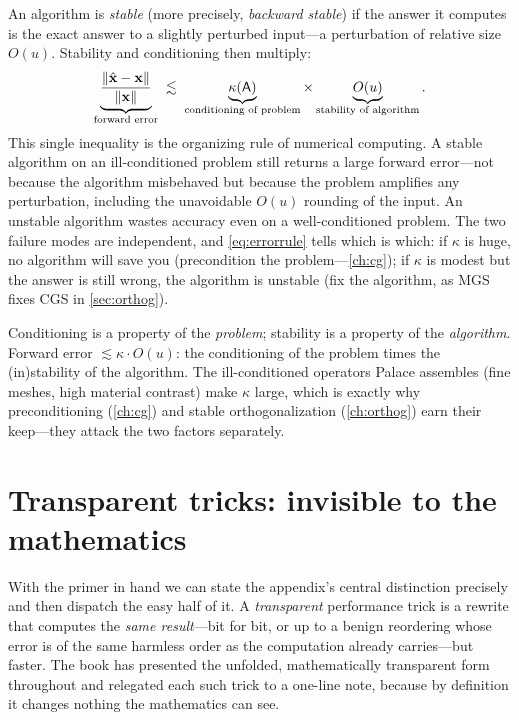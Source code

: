 An algorithm is \emph{stable} (more precisely, \emph{backward stable}) if the
answer it computes is the exact answer to a slightly perturbed input---a
perturbation of relative size $O(u)$. Stability and conditioning then multiply:
\begin{equation}
\label{eq:errorrule}
  \underbrace{\frac{\lVert\hat{\mathbf{x}} - \mathbf{x}\rVert}{\lVert\mathbf{x}\rVert}}_{\text{forward error}}
  \;\lesssim\;
  \underbrace{\kappa(\mathsf{A})}_{\text{conditioning of problem}}
  \times
  \underbrace{O(u)}_{\text{stability of algorithm}} .
\end{equation}
This single inequality is the organizing rule of numerical computing. A stable
algorithm on an ill-conditioned problem still returns a large forward error---not
because the algorithm misbehaved but because the problem amplifies any
perturbation, including the unavoidable $O(u)$ rounding of the input. An unstable
algorithm wastes accuracy even on a well-conditioned problem. The two failure modes
are independent, and \eqref{eq:errorrule} tells which is which: if $\kappa$ is huge,
no algorithm will save you (precondition the problem---\cref{ch:cg}); if $\kappa$ is
modest but the answer is still wrong, the algorithm is unstable (fix the algorithm,
as MGS fixes CGS in \cref{sec:orthog}).

\begin{keyidea}
Conditioning is a property of the \emph{problem}; stability is a property of the
\emph{algorithm}. Forward error $\lesssim \kappa \cdot O(u)$: the conditioning of
the problem times the (in)stability of the algorithm. The ill-conditioned operators
Palace assembles (fine meshes, high material contrast) make $\kappa$ large, which
is exactly why preconditioning (\cref{ch:cg}) and stable orthogonalization
(\cref{ch:orthog}) earn their keep---they attack the two factors separately.
\end{keyidea}

\section{Transparent tricks: invisible to the mathematics}
\label{sec:transparent}

With the primer in hand we can state the appendix's central distinction precisely
and then dispatch the easy half of it. A \emph{transparent} performance trick is a
rewrite that computes the \emph{same result}---bit for bit, or up to a benign
reordering whose error is of the same harmless order as the computation
already carries---but faster. The book has presented the unfolded, mathematically
transparent form throughout and relegated each such trick to a one-line note,
because by definition it changes nothing the mathematics can see.

